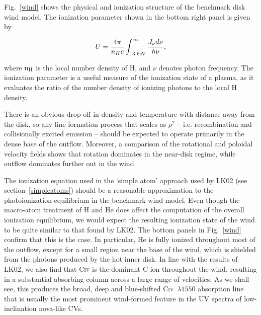 \documentclass[preprint, a4paper, 11pt]{aastex}
\begin{document}
Fig.~\ref{wind} shows the physical and ionization structure 
of the benchmark disk wind model. The ionization parameter shown in the bottom
right panel is given by

\begin{equation}
U = \frac{4\pi}{n_H c}\int_{13.6{\rm{eV}}}^{\infty}\frac{{J_{\nu}d\nu}}{h\nu},
\end{equation}
 
\noindent where $\rm{n_H}$ is the local number density of H, and $\nu$ denotes photon 
frequency. The ionization parameter is a useful measure of the ionization state of a plasma, 
as it evaluates the ratio of the number density of ionizing photons to the local 
H density.


There is an obvious drop-off in density
and temperature with distance away from the disk, so any line
formation process that scales as $\rho^2$ -- i.e. recombination and
collisionally excited emission -- should be expected to operate
primarily in the dense base of the outflow. Moreover, a comparison of
the rotational and poloidal velocity fields shows that rotation
dominates in the near-disk regime, while outflow dominates further out
in the wind. 

The ionization equation used in the `simple atom' approach used by
LK02 (see section~\ref{simpleatoms}) should be a reasonable approximation to
the photoionization equilibrium in the benchmark wind model. Even
though the macro-atom treatment of H and He does affect the 
computation of the overall ionization equilibrium, we would expect the
resulting ionization state of the wind to be quite similar to that
found by LK02. The bottom panels in Fig.~\ref{wind} confirm that this
is the case. In particular, He is fully ionized
throughout most of the outflow, except for a small region near the
base of the wind, which is shielded from the photons produced by the
hot inner disk. In line with the results of LK02, we also find
that C\textsc{iv} is the dominant C ion throughout the wind,
resulting in a substantial absorbing column across a large range of
velocities. As we shall see, this produces the broad, deep and
blue-shifted C\textsc{iv}~$\lambda1550$ absorption line that
is usually the most prominent wind-formed feature in the UV spectra of
low-inclination nova-like CVs.
\end{document}
